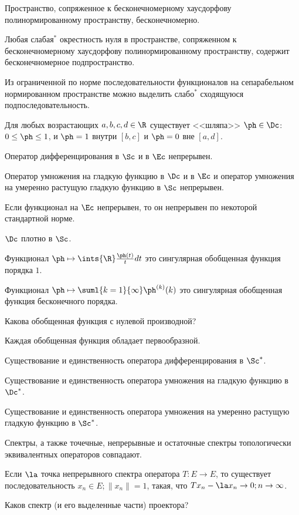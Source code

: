 \documentclass[a4paper]{article}
\begin{document}
\begin{nums}{-1}
\item  Пространство, сопряженное к бесконечномерному хаусдорфову полинормированному
пространству, бесконечномерно.
\item Любая слабая$^*$ окрестность нуля в пространстве, сопряженном к
бесконечномерному хаусдорфову полинормированному пространству, содержит бесконечномерное
подпространство.

\item Из ограниченной по норме последовательности функционалов на сепарабельном нормированном
пространстве можно выделить слабо$^*$ сходящуюся подпоследовательность.
\item Для любых возрастающих $a,b,c,d\in \R$ существует <<шляпа>> $\ph \in\Dc$:
$0\le\ph\le 1$, и $\ph=1$ внутри $[b,c]$ и $\ph=0$ вне $[a,d]$.

\item Оператор дифференцирования в $\Sc$ и в $\Ec$ непрерывен.
\item Оператор умножения на гладкую функцию в $\Dc$ и в $\Ec$ и оператор умножения на
умеренно растущую гладкую функцию в $\Sc$ непрерывен.
\item Если функционал на $\Ec$ непрерывен, то он непрерывен по некоторой стандартной норме.
\item $\Dc$ плотно в $\Sc$.
\item Функционал $\ph\mapsto\ints{\R}\frac{\ph(t)}{t}dt$ это сингулярная обобщенная функция порядка $1$.
\item Функционал $\ph\mapsto\suml{k=1}{\infty}\ph^{(k)}(k)$ это сингулярная обобщенная
функция бесконечного порядка.
\item Какова обобщенная функция с нулевой производной?
\item Каждая обобщенная функция обладает первообразной.
\item Существование и единственность оператора дифференцирования в $\Sc^*$.
\item Существование и единственность оператора умножения на гладкую функцию в $\Dc^*$.
\item Существование и единственность оператора умножения на умеренно растущую гладкую функцию в $\Sc^*$.
\item Спектры, а также точечные, непрерывные и остаточные спектры топологически эквивалентных операторов совпадают.
\item Если $\la$ точка непрерывного спектра оператора $T:E\to E$, то существует
последовательность $x_n\in E;\|x_n\|=1$, такая, что $Tx_n-\la x_n\to0; n\to\infty$.
\item Каков спектр (и его выделенные части) проектора?

\end{nums}
\end{document}
